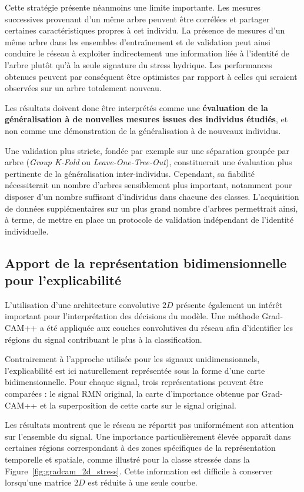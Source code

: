 \documentclass[12pt,a4paper,twoside]{article}
\begin{document}
Cette stratégie présente néanmoins une limite importante. Les mesures successives provenant d'un même arbre peuvent être corrélées et partager certaines caractéristiques propres à cet individu. La présence de mesures d'un même arbre dans les ensembles d'entraînement et de validation peut ainsi conduire le réseau à exploiter indirectement une information liée à l'identité de l'arbre plutôt qu'à la seule signature du stress hydrique. Les performances obtenues peuvent par conséquent être optimistes par rapport à celles qui seraient observées sur un arbre totalement nouveau.

Les résultats doivent donc être interprétés comme une \textbf{évaluation de la généralisation à de nouvelles mesures issues des individus étudiés}, et non comme une démonstration de la généralisation à de nouveaux individus.

Une validation plus stricte, fondée par exemple sur une séparation groupée par arbre (\textit{Group K-Fold} ou \textit{Leave-One-Tree-Out}), constituerait une évaluation plus pertinente de la généralisation inter-individus. Cependant, sa fiabilité nécessiterait un nombre d'arbres sensiblement plus important, notamment pour disposer d'un nombre suffisant d'individus dans chacune des classes. L'acquisition de données supplémentaires sur un plus grand nombre d'arbres permettrait ainsi, à terme, de mettre en place un protocole de validation indépendant de l'identité individuelle.

\subsection{Apport de la représentation bidimensionnelle pour l'explicabilité}
\label{subsec:gradcam_2d}

L'utilisation d'une architecture convolutive $2D$ présente également un intérêt important pour l'interprétation des décisions du modèle. Une méthode Grad-CAM++ a été appliquée aux couches convolutives du réseau afin d'identifier les régions du signal contribuant le plus à la classification.

Contrairement à l'approche utilisée pour les signaux unidimensionnels, l'explicabilité est ici naturellement représentée sous la forme d'une carte bidimensionnelle. Pour chaque signal, trois représentations peuvent être comparées : le signal RMN original, la carte d'importance obtenue par Grad-CAM++ et la superposition de cette carte sur le signal original.

Les résultats montrent que le réseau ne répartit pas uniformément son attention sur l'ensemble du signal. Une importance particulièrement élevée apparaît dans certaines régions correspondant à des zones spécifiques de la représentation temporelle et spatiale, comme illustré pour la classe stressée dans la Figure~\ref{fig:gradcam_2d_stress}. Cette information est difficile à conserver lorsqu'une matrice $2D$ est réduite à une seule courbe.
\end{document}
